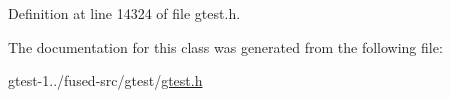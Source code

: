 \-Definition at line 14324 of file gtest.\-h.



\-The documentation for this class was generated from the following file\-:\begin{DoxyCompactItemize}
\item 
gtest-\/1../fused-\/src/gtest/\hyperlink{fused-src_2gtest_2gtest_8h}{gtest.\-h}\end{DoxyCompactItemize}
